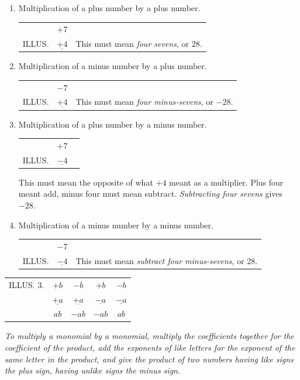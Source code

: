 \documentclass{book}
\begin{document}
\begin{enumerate}

\item Multiplication of a plus number by a plus number.

\begin{tabular}{ccc}
& $+7$&\\
ILLUS. &$\underline{+ 4}$& This must mean \textit{four sevens}, or
28.
\end{tabular}

\item Multiplication of a minus number by a plus number.

\begin{tabular}{ccc}
&$-7$ &\\
ILLUS. &$\underline{+ 4}$ &This must mean \textit{four
minus-sevens}, or $-
28$.\\
\end{tabular}

\item Multiplication of a plus number by a minus number.

\begin{tabular}{ccl}
&$+7$&\\
ILLUS. &$\underline{- 4}$ &\\
\end{tabular}
This must mean the opposite of what $+4$ meant as a multiplier.
Plus four meant add, minus four must mean subtract.
\textit{Subtracting four sevens} gives $-28$.

\item Multiplication of a minus number by a minus number.

\begin{tabular}{ccl}
&$-7$&\\

ILLUS. &$\underline{-4}$& This must mean \textit{subtract four
minus-sevens}, or 28.
\end{tabular}
\end{enumerate}

\begin{tabular}{ccccc}
ILLUS. 3. &$+b$&$-b$&$+b$&$-b$\\
& $\underline{+a}$& $\underline{+a}$& $\underline{-a}$& $\underline{-a}$\\
&$ab$ &$-ab$&$-ab$&$ab$\\
\end{tabular}


\textit{To multiply a monomial by a monomial, multiply the
coefficients together for the coefficient of the product, add the
exponents of like letters for the exponent of the same letter in
the product, and give the product of two numbers having like signs
the plus sign, having unlike signs the minus sign.}
\end{document}
